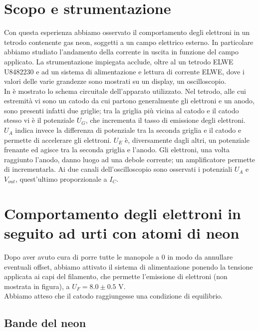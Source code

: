 \section{Scopo e strumentazione}

Con questa esperienza abbiamo osservato il comportamento degli elettroni in un tetrodo contenente gas neon, soggetti a un campo elettrico esterno. In particolare abbiamo studiato l'andamento della corrente in uscita in funzione del campo applicato. La strumentazione impiegata acclude, oltre al un tetrodo ELWE U8482230 e ad un sistema di alimentazione e lettura di corrente ELWE, dove i valori delle varie grandezze sono mostrati su un display, un oscilloscopio.\\
In  è mostrato lo schema circuitale dell'apparato utilizzato. Nel tetrodo, alle cui estremità vi sono un catodo da cui partono generalmente gli elettroni e un anodo, sono presenti infatti due griglie; tra la griglia più vicina al catodo e il catodo stesso vi è il potenziale 
$U_G$, che incrementa il tasso di emissione degli elettroni. $U_A$ indica invece la differenza di potenziale tra la seconda griglia e il catodo e permette di accelerare gli elettroni. $U_E$ è, diversamente dagli altri, un potenziale frenante ed agisce tra la seconda griglia e l'anodo. Gli elettroni, una volta raggiunto l'anodo, danno luogo ad una debole corrente; un amplificatore permette di incrementarla. Ai due canali dell'oscilloscopio sono osservati i potenziali $U_A$ e $V_{out}$, quest'ultimo proporzionale a $I_C$.

\section{Comportamento degli elettroni in seguito ad urti con atomi di neon}

Dopo aver avuto cura di porre tutte le manopole a 0 in modo da annullare eventuali offset, abbiamo attivato il sistema di alimentazione ponendo la tensione applicata ai capi del filamento, che permette l'emissione di elettroni (non mostrata in figura), a $U_F = 8.0 \pm 0.5$ V.\\  Abbiamo atteso che il catodo raggiungesse una condizione di equilibrio.

\subsection{Bande del neon}

